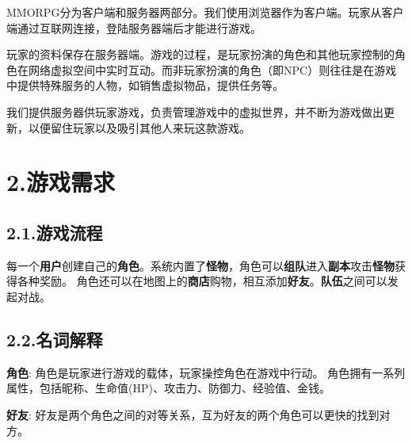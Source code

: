 \documentclass{article}
\begin{document}
\noindent{}MMORPG分为客户端和服务器两部分。我们使用浏览器作为客户端。玩家从客户端通过互联网连接，登陆服务器端后才能进行游戏。%

玩家的资料保存在服务器端。游戏的过程，是玩家扮演的角色和其他玩家控制的角色在网络虚拟空间中实时互动。而非玩家扮演的角色（即NPC）则往往是在游戏中提供特殊服务的人物，如销售虚拟物品，提供任务等。%

我们提供服务器供玩家游戏，负责管理游戏中的虚拟世界，并不断为游戏做出更新，以便留住玩家以及吸引其他人来玩这款游戏。%

\section{2.\hspace*{0.5em}游戏需求}\label{2}%

\subsection{2.1.\hspace*{0.5em}游戏流程}\label{21}%

\noindent{}每一个\textbf{用户}创建自己的\textbf{角色}。系统内置了\textbf{怪物}，角色可以\textbf{组队}进入\textbf{副本}攻击\textbf{怪物}获得各种奖励。 角色还可以在地图上的\textbf{商店}购物，相互添加\textbf{好友}。\textbf{队伍}之间可以发起对战。%

\subsection{2.2.\hspace*{0.5em}名词解释}\label{22}%

\noindent{}\textbf{角色}: 角色是玩家进行游戏的载体，玩家操控角色在游戏中行动。 角色拥有一系列属性，包括昵称、生命值(HP)、攻击力、防御力、经验值、金钱。%

\textbf{好友}: 好友是两个角色之间的对等关系，互为好友的两个角色可以更快的找到对方。%
\end{document}
